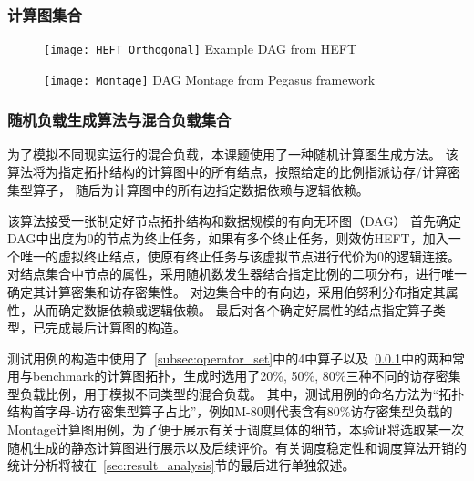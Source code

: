         \subsubsection{计算图集合}\label{subsec:compute_graph_set}
        \begin{figure}[!htbp]
            \centering
            \texttt{[image: HEFT\_Orthogonal]}
            {\quad Example DAG from HEFT\citep{topcuoglu_performance-effective_2002}}
            \label{fig:HEFT_Orthogonal}
        \end{figure}
        \begin{figure}[!htbp]
            \centering
            \texttt{[image: Montage]}
            {\quad DAG Montage from Pegasus\citep{deelman_pegasus_2005} framework}
            \label{fig:Montage}
        \end{figure}
        
        \subsubsection{随机负载生成算法与混合负载集合}\label{subsec:actual_load_set}
        为了模拟不同现实运行的混合负载，本课题使用了一种随机计算图生成方法。
        该算法将为指定拓扑结构的计算图中的所有结点，按照给定的比例指派访存/计算密集型算子，
        随后为计算图中的所有边指定数据依赖与逻辑依赖。
        
        该算法接受一张制定好节点拓扑结构和数据规模的有向无环图（DAG）
        首先确定DAG中出度为0的节点为终止任务，如果有多个终止任务，则效仿HEFT，加入一个唯一的虚拟终止结点，使原有终止任务与该虚拟节点进行代价为0的逻辑连接。
        对结点集合中节点的属性，采用随机数发生器结合指定比例的二项分布，进行唯一确定其计算密集和访存密集性。
        对边集合中的有向边，采用伯努利分布指定其属性，从而确定数据依赖或逻辑依赖。
        最后对各个确定好属性的结点指定算子类型，已完成最后计算图的构造。

        测试用例的构造中使用了~\ref{subsec:operator_set}中的4中算子以及~\ref{subsec:compute_graph_set}中的两种常用与benchmark的计算图拓扑，生成时选用了20\%, 50\%, 80\%三种不同的访存密集型负载比例，用于模拟不同类型的混合负载。
        其中，测试用例的命名方法为“拓扑结构首字母-访存密集型算子占比”，例如M-80则代表含有80\%访存密集型负载的Montage计算图用例，为了便于展示有关于调度具体的细节，本验证将选取某一次随机生成的静态计算图进行展示以及后续评价。有关调度稳定性和调度算法开销的统计分析将被在~\ref{sec:result_analysis}节的最后进行单独叙述。

